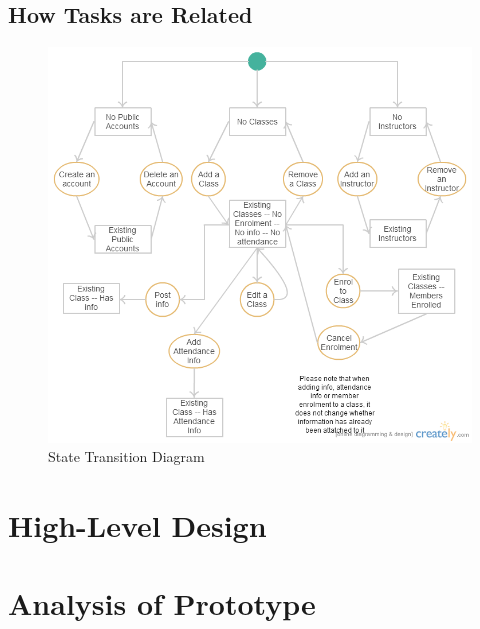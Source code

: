 \documentclass[11pt, article]{article}
\begin{document}
	\newpage
	\subsection{How Tasks are Related}
	
			\begin{figure}[ht!]
	\includegraphics[scale=0.6]{images/Statediagram}
 	\caption{State Transition Diagram}
	\end{figure}
	
	\section{High-Level Design}
	
	\section{Analysis of Prototype}




\end{document}
